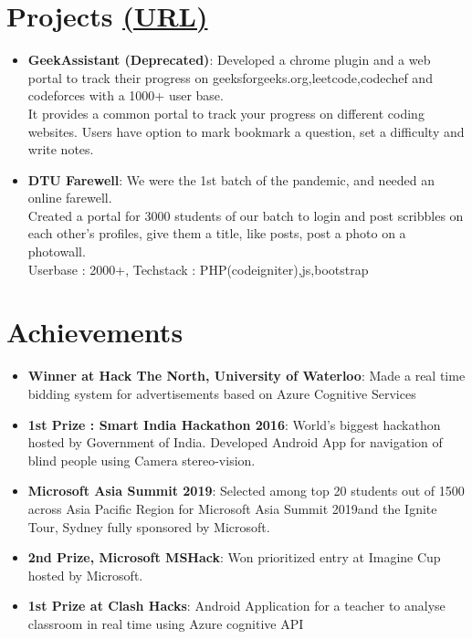\documentclass[letterpaper,11pt]{article}
\newcommand{\resumeItem}[2]{
  \item\small{
    \textbf{#1}{: #2 \vspace{2pt}}
  }
}
\newcommand{\resumeSubItem}[2]{\resumeItem{#1}{#2}\vspace{-6pt}}
\newcommand{\resumeSubHeadingListStart}{\begin{itemize}[leftmargin=*]}
\newcommand{\resumeSubHeadingListEnd}{\end{itemize}}
\begin{document}
\section{Projects    \href{https://ronaksakhuja.github.io/projects.html}{(URL)}}
  \resumeSubHeadingListStart
    \resumeSubItem{GeekAssistant (Deprecated)}
      {Developed a chrome plugin and a web portal to track their progress on geeksforgeeks.org,leetcode,codechef and codeforces with a 1000+ user base.}
      \\[0.5em]\textbullet
      { It provides a common portal to track your progress on different coding websites. Users have option to mark bookmark a question, set a difficulty and write notes.}
    \resumeSubItem{DTU Farewell}
      {We were the 1st batch of the pandemic, and needed an online farewell.}
      \\[0.5em]\textbullet
      { Created a portal for 3000 students of our batch to login and post scribbles on each other's profiles, give them a title, like posts, post a photo on a photowall.}
      \\[0em]\textbullet
      { Userbase : 2000+, Techstack : PHP(codeigniter),js,bootstrap}
  \resumeSubHeadingListEnd

\section{Achievements}
    \resumeSubHeadingListStart
    \resumeSubItem
    {Winner at Hack The North, University of Waterloo}
    {Made a real time bidding system for advertisements based on Azure Cognitive Services}
    \resumeSubItem
    {1st Prize : Smart India Hackathon 2016}
    {World's biggest hackathon hosted by Government of India. Developed Android App for navigation of blind people using Camera stereo-vision.}
    \resumeSubItem
    {Microsoft Asia Summit 2019}
    {Selected among top 20 students out of 1500 across Asia Pacific Region for Microsoft Asia Summit 2019and the Ignite Tour, Sydney fully sponsored by Microsoft.}
    \resumeSubItem
    {2nd Prize, Microsoft MSHack}
    { Won prioritized entry at Imagine Cup hosted by Microsoft.}
    \resumeSubItem
    {1st Prize at Clash Hacks}
    {Android Application for a teacher to analyse classroom in real time using Azure cognitive API}
    \resumeSubHeadingListEnd
\end{document}
